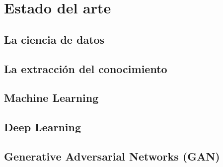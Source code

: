 \section{Estado del arte}

\subsection{La ciencia de datos}
\subsection{La extracción del conocimiento}


\subsection{Machine Learning}
\subsection{Deep Learning}
\subsection{Generative Adversarial Networks (GAN)}
